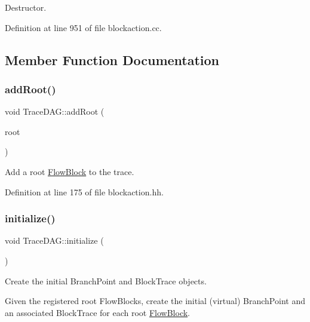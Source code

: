 Destructor. 



Definition at line 951 of file blockaction.\+cc.



\subsection{Member Function Documentation}
\mbox{\label{class_trace_d_a_g_a1bfbd6888e04cc4688510f67464d8c89}} 
\subsubsection{\texorpdfstring{addRoot()}{addRoot()}}
{\footnotesize\ttfamily void Trace\+D\+A\+G\+::add\+Root (\begin{DoxyParamCaption}\item[{\mbox{\hyperlink{class_flow_block}{Flow\+Block}} $\ast$}]{root }\end{DoxyParamCaption})\hspace{0.3cm}{\ttfamily [inline]}}



Add a root \mbox{\hyperlink{class_flow_block}{Flow\+Block}} to the trace. 



Definition at line 175 of file blockaction.\+hh.

\mbox{\label{class_trace_d_a_g_a6d28fcd17f9782ecb53d790bf2b4264c}} 
\subsubsection{\texorpdfstring{initialize()}{initialize()}}
{\footnotesize\ttfamily void Trace\+D\+A\+G\+::initialize (\begin{DoxyParamCaption}\item[{void}]{ }\end{DoxyParamCaption})}



Create the initial Branch\+Point and Block\+Trace objects. 

Given the registered root Flow\+Blocks, create the initial (virtual) Branch\+Point and an associated Block\+Trace for each root \mbox{\hyperlink{class_flow_block}{Flow\+Block}}. 

